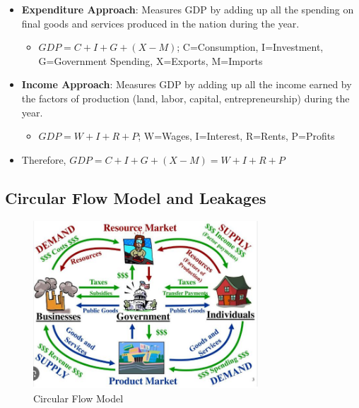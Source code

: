 \documentclass[
  letterpaper,
  DIV=11,
  numbers=noendperiod]{scrartcl}
\providecommand{\tightlist}{%
  \setlength{\itemsep}{0pt}\setlength{\parskip}{0pt}}\usepackage{longtable,booktabs,array}
\begin{document}
\begin{itemize}
\tightlist
\item
  \textbf{Expenditure Approach}: Measures GDP by adding up all the
  spending on final goods and services produced in the nation during the
  year.

  \begin{itemize}
  \tightlist
  \item
    \(GDP = C + I + G + (X-M)\); C=Consumption, I=Investment,
    G=Government Spending, X=Exports, M=Imports
  \end{itemize}
\item
  \textbf{Income Approach}: Measures GDP by adding up all the income
  earned by the factors of production (land, labor, capital,
  entrepreneurship) during the year.

  \begin{itemize}
  \tightlist
  \item
    \(GDP = W + I + R + P\); W=Wages, I=Interest, R=Rents, P=Profits
  \end{itemize}
\item
  Therefore, \(GDP = C + I + G + (X-M) = W + I + R + P\)
\end{itemize}

\newpage{}

\subsection{Circular Flow Model and
Leakages}\label{circular-flow-model-and-leakages}

\begin{figure}[H]

{\centering \includegraphics[width=0.75\textwidth,height=\textheight]{img/circular-flow.jpg}

}

\caption{Circular Flow Model}

\end{figure}%
\end{document}
